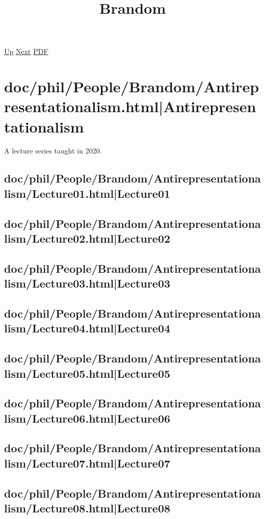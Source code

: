 \documentclass[12pt,a4paper]{report}
\begin{document}
 \href{doc/phil/People.html}{Up} 
 \href{doc/phil/People/Kant.html}{Next} 
 \href{doc/phil/People/Brandom.pdf}{PDF} 
\title{Brandom}

\tableofcontents

\part{doc/phil/People/Brandom/Antirepresentationalism.html|Antirepresentationalism}
A lecture series taught in 2020.
\chapter{doc/phil/People/Brandom/Antirepresentationalism/Lecture01.html|Lecture01}

\chapter{doc/phil/People/Brandom/Antirepresentationalism/Lecture02.html|Lecture02}

\chapter{doc/phil/People/Brandom/Antirepresentationalism/Lecture03.html|Lecture03}

\chapter{doc/phil/People/Brandom/Antirepresentationalism/Lecture04.html|Lecture04}

\chapter{doc/phil/People/Brandom/Antirepresentationalism/Lecture05.html|Lecture05}

\chapter{doc/phil/People/Brandom/Antirepresentationalism/Lecture06.html|Lecture06}

\chapter{doc/phil/People/Brandom/Antirepresentationalism/Lecture07.html|Lecture07}

\chapter{doc/phil/People/Brandom/Antirepresentationalism/Lecture08.html|Lecture08}
\end{document}
